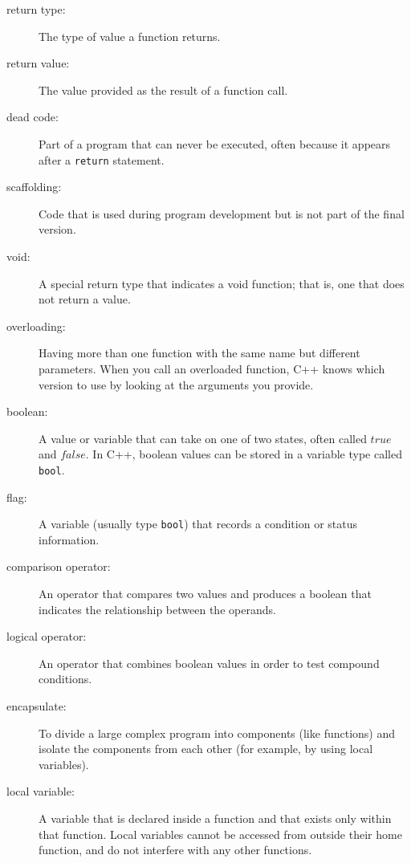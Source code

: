 \begin{description}

\item[return type:]  The type of value a function returns.

\item[return value:]  The value provided as the result of a function
call.

\item[dead code:]  Part of a program that can never be executed,
often because it appears after a {\tt return} statement.

\item[scaffolding:]  Code that is used during program development
but is not part of the final version.

\item[void:]  A special return type that indicates a void function;
that is, one that does not return a value.

\item[overloading:]  Having more than one function with the same name
but different parameters.  When you call an overloaded function,
C++ knows which version to use by looking at the arguments you
provide.

\item[boolean:]  A value or variable that can take on one of
two states, often called $true$ and $false$.  In C++, boolean
values can be stored in a variable type called {\tt bool}.

\item[flag:]  A variable (usually type {\tt bool}) that records
a condition or status information.

\item[comparison operator:]  An operator that compares two values
and produces a boolean that indicates the relationship between the
operands.

\item[logical operator:]  An operator that combines boolean values
in order to test compound conditions.


\item[encapsulate:]  To divide a large complex program into
components (like functions) and isolate the components from
each other (for example, by using local variables).

\item[local variable:]  A variable that is declared inside
a function and that exists only within that function.  Local variables
cannot be accessed from outside their home function, and do not
interfere with any other functions.


\end{description}
